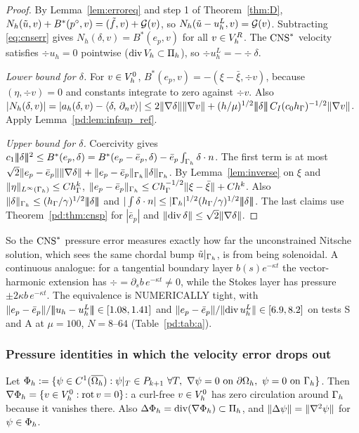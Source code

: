 \begin{proof}
By Lemma~\ref{lem:erroreq} and step 1 of Theorem~\ref{thm:D}, $N_h(\tilde u,v)+B^\ast(p^\circ,v)=(\tilde f,v)+\mathcal G(v)$, so $N_h(\tilde u-u_h^L,v)=\mathcal G(v)$. Subtracting \eqref{eq:cnserr} gives $N_h(\delta,v)=B^\ast(e_p,v)$ for all $v\in V_h^R$. The $\mathrm{CNS}^\ast$ velocity satisfies $\div u_h=0$ pointwise ($\operatorname{div}V_h\subset\Pi_h$), so $\div u_h^L=-\div\delta$.

\emph{Lower bound for $\delta$.} For $v\in V_h^0$, $B^\ast(e_p,v)=-(\xi-\bar\xi,\div v)$, because $(\eta,\div v)=0$ and constants integrate to zero against $\div v$. Also $|N_h(\delta,v)|=|a_h(\delta,v)-\langle \delta,\, \partial_n v\rangle|\le2\lVert \nabla\delta\rVert\lVert \nabla v\rVert+(h/\mu)^{1/2}|\!|\!|\delta|\!|\!|\,C_I(c_0h_\Gamma)^{-1/2}\lVert \nabla v\rVert$. Apply Lemma~\ref{pd:lem:infsup_ref}.

\emph{Upper bound for $\delta$.} Coercivity gives $c_1|\!|\!|\delta|\!|\!|^2\le B^\ast(e_p,\delta)=B^\ast(e_p-\bar e_p,\delta)-\bar e_p\int_{\Gamma_h}\delta\cdot n$. The first term is at most $\sqrt2\lVert e_p-\bar e_p\rVert\lVert \nabla\delta\rVert+\lVert e_p-\bar e_p\rVert_{\Gamma_h}\lVert \delta\rVert_{\Gamma_h}$. By Lemma~\ref{lem:inverse} on $\xi$ and $\lVert \eta\rVert_{L^\infty(\Gamma_h)}\le Ch_\Gamma^k$, $\lVert e_p-\bar e_p\rVert_{\Gamma_h}\le Ch_\Gamma^{-1/2}\lVert \xi-\bar\xi\rVert+Ch^k$. Also $\lVert \delta\rVert_{\Gamma_h}\le(h_\Gamma/\gamma)^{1/2}|\!|\!|\delta|\!|\!|$ and $|\int\delta\cdot n|\le|\Gamma_h|^{1/2}(h_\Gamma/\gamma)^{1/2}|\!|\!|\delta|\!|\!|$. The last claims use Theorem~\ref{pd:thm:cnsp} for $|\bar e_p|$ and $\lVert \operatorname{div}\delta\rVert\le\sqrt2\lVert \nabla\delta\rVert$.
\end{proof}

\begin{remark}
So the $\mathrm{CNS}^\ast$ pressure error measures exactly how far the unconstrained Nitsche solution, which sees the same chordal bump $\tilde u|_{\Gamma_h}$, is from being solenoidal. A continuous analogue: for a tangential boundary layer $b(s)e^{-\kappa t}$ the vector-harmonic extension has $\div=\partial_sb\,e^{-\kappa t}\neq0$, while the Stokes layer has pressure $\pm2\kappa b\,e^{-\kappa t}$. The equivalence is NUMERICALLY tight, with $\lVert e_p-\bar e_p\rVert/|\!|\!|u_h-u_h^L|\!|\!|\in[1.08,1.41]$ and $\lVert e_p-\bar e_p\rVert/\lVert \operatorname{div} u_h^L\rVert\in[6.9,8.2]$ on tests S and A at $\mu=100$, $N=8$--$64$ (Table~\ref{pd:tab:a}).
\end{remark}

\subsubsection{Pressure identities in which the velocity error drops out}

Let $\Phi_h:=\{\psi\in C^1(\overline{\Omega_h}):\psi|_T\in P_{k+1}\ \forall T,\ \nabla\psi=0\text{ on }\partial\Omega_h,\ \psi=0\text{ on }\Gamma_h\}$. Then $\nabla\Phi_h=\{v\in V_h^0:\operatorname{rot} v=0\}$: a curl-free $v\in V_h^0$ has zero circulation around $\Gamma_h$ because it vanishes there. Also $\Delta\Phi_h=\operatorname{div}(\nabla\Phi_h)\subset\Pi_h$, and $\lVert \Delta\psi\rVert=\lVert \nabla^2\psi\rVert$ for $\psi\in\Phi_h$.

